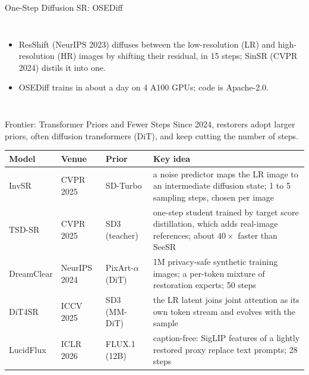 \begin{frame}{One-Step Diffusion SR: OSEDiff}
\begin{columns}[T,onlytextwidth]
      \vspace{0.3em}
      \begin{itemize}\scriptsize\itemsep0.25em
        \item ResShift (NeurIPS 2023) diffuses between the low-resolution (LR) and high-resolution (HR) images by shifting their residual, in 15 steps; SinSR (CVPR 2024) distils it into one.
        \item OSEDiff trains in about a day on 4 A100 GPUs; code is Apache-2.0.
      \end{itemize}
  \end{columns}
\end{frame}

\begin{frame}{Frontier: Transformer Priors and Fewer Steps}
  \footnotesize
  Since 2024, restorers adopt larger priors, often diffusion transformers (DiT), and keep cutting the number of steps.\par
  \vspace{0.3em}
  {\centering\scriptsize
  \begin{tabular}{>{\raggedright\arraybackslash}p{1.45cm} >{\raggedright\arraybackslash}p{1.65cm} >{\raggedright\arraybackslash}p{2.15cm} >{\raggedright\arraybackslash}p{6.4cm}}
    \toprule
    \textbf{Model} & \textbf{Venue} & \textbf{Prior} & \textbf{Key idea} \\
    \midrule
    InvSR & CVPR 2025 & SD-Turbo & a noise predictor maps the LR image to an intermediate diffusion state; 1 to 5 sampling steps, chosen per image \\
    \addlinespace[0.15em]
    TSD-SR & CVPR 2025 & SD3 (teacher) & one-step student trained by target score distillation, which adds real-image references; about $40\times$ faster than SeeSR \\
    \addlinespace[0.15em]
    DreamClear & NeurIPS 2024 & PixArt-$\alpha$ (DiT) & 1M privacy-safe synthetic training images; a per-token mixture of restoration experts; 50 steps \\
    \addlinespace[0.15em]
    DiT4SR & ICCV 2025 & SD3 (MM-DiT) & the LR latent joins joint attention as its own token stream and evolves with the sample \\
    \addlinespace[0.15em]
    LucidFlux & ICLR 2026 & FLUX.1 (12B) & caption-free: SigLIP features of a lightly restored proxy replace text prompts; 28 steps \\
    \bottomrule
  \end{tabular}\par}
  \vspace{0.3em}

\end{frame}
